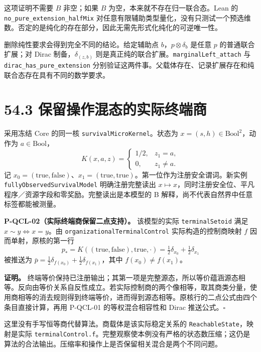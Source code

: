 \documentclass[
  11pt,
  oneside]{book}
\begin{document}
这项证明不需要 \(B\) 非空；如果 \(B\) 为空，本来就不存在归一联合态。Lean
的 \texttt{no\_\allowbreak pure\_\allowbreak extension\_\allowbreak half\allowbreak Mix}
对任意有限辅助类型量化，没有只测试一个预选维数。否定的是纯化的存在部分，因此无需先形式化纯化的可逆唯一性。

删除纯性要求会得到完全不同的结论。给定辅助点 \(b\)，\(p\otimes\delta_b\)
是任意 \(p\) 的普通联合扩展；对 Dirac 制备，\(\delta_{(z,b)}\)
则是真正纯的联合扩展。\texttt{marginal\allowbreak Left\_\allowbreak attach} 与
\texttt{dirac\_\allowbreak has\_\allowbreak pure\_\allowbreak extension}
分别验证这两件事。父载体存在、记录扩展存在和纯联合态存在具有不同的数学要求。

\section{54.3 保留操作混态的实际终端商}

采用冻结 Core 的同一核 \texttt{survival\allowbreak Micro\allowbreak Kernel}。状态为
\(x=(s,h)\in\mathrm{Bool}^2\)，动作为 \(a\in\mathrm{Bool}\)， \[
K(x,a,z)=\begin{cases}1/2,&z_1=a,\\0,&z_1\ne a.\end{cases}
\] 记
\(x_0=(\mathrm{true},\mathrm{false})\)、\(x_1=(\mathrm{true},\mathrm{true})\)。第一位作为注册安全谓词。新实例
\texttt{fully\allowbreak Observed\allowbreak Survival\allowbreak Model} 明确注册完整读出
\(x\mapsto x\)，同时注册安全位、平凡程序／资源字段和零奖励。完整读出是本模型的
B 解释，尚不代表自然界中任意标签都能被测量。

\protect\hypertarget{p-qcl-02}{}{}

\textbf{P-QCL-02（实际终端商保留二点支持）。} 该模型的实际
\texttt{terminal\allowbreak Setoid} 满足 \(x\sim y\iff x=y\)。由
\texttt{organizational\allowbreak Terminal\allowbreak Control} 实际构造的控制商映射 \(f\)
因而单射，原核的第一行 \[
p_* = K((\mathrm{true},\mathrm{false}),\mathrm{true},\cdot)
=\tfrac12\delta_{x_0}+\tfrac12\delta_{x_1}
\] 被推送为
\(\bar p=\tfrac12\delta_{f(x_0)}+\tfrac12\delta_{f(x_1)}\)，其中
\(f(x_0)\ne f(x_1)\)。

\textbf{证明。}
终端等价保持已注册输出；其第一项是完整源态，所以等价蕴涵源态相等。反向由等价关系自反性成立。若实际控制商的两个像相等，取其商类分量，使用商相等的消去规则得到终端等价，进而得到源态相等。原核行的二点公式由四个条目直接计算，再用
P-QCL-01 的等权混合相容性和 Dirac 推送公式。\(\square\)

这里没有手写恒等商代替算法。商载体是该实际稳定关系的
\texttt{Reachable\allowbreak State}，映射是实际
\texttt{terminal\allowbreak Control.\allowbreak f}。完整观察使本例没有严格的状态数压缩；这仍是算法的合法输出。压缩率和操作上是否保留相关混合是两个不同问题。
\end{document}
